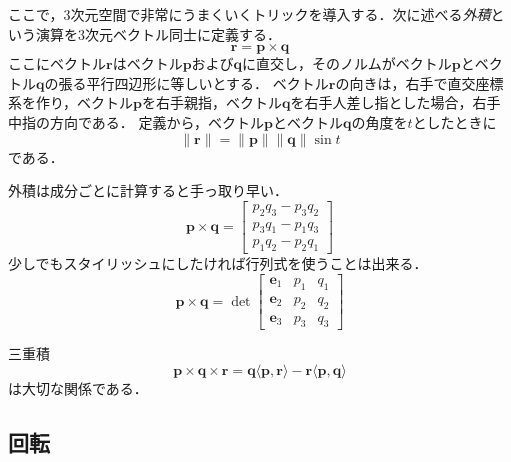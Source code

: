 \documentclass{jsbook}
\newcommand{\keyword}[1]{\emph{#1}}
\newcommand{\bvec}[1]{\boldsymbol{#1}}
\newcommand{\norm}[1]{\|{#1}\|}
\newcommand{\ve}{\bvec{e}}
\begin{document}
ここで，3次元空間で非常にうまくいくトリックを導入する．次に述べる\keyword{外積}という演算を3次元ベクトル同士に定義する．
\begin{equation}
\bvec{r}=\bvec{p}\times\bvec{q}
\end{equation}
ここにベクトル$\bvec{r}$はベクトル$\bvec{p}$および$\bvec{q}$に直交し，そのノルムがベクトル$\bvec{p}$とベクトル$\bvec{q}$の張る平行四辺形に等しいとする．
ベクトル$\bvec{r}$の向きは，右手で直交座標系を作り，ベクトル$\bvec{p}$を右手親指，ベクトル$\bvec{q}$を右手人差し指とした場合，右手中指の方向である．
%
%
定義から，ベクトル$\bvec{p}$とベクトル$\bvec{q}$の角度を$t$としたときに
\begin{equation}
\norm{\bvec{r}}=\norm{\bvec{p}}\norm{\bvec{q}}\sin t
\end{equation}
である．

外積は成分ごとに計算すると手っ取り早い．
\begin{equation}
\bvec{p}\times\bvec{q}=\begin{bmatrix}p_2q_3-p_3q_2\\p_3q_1-p_1q_3\\p_1q_2-p_2q_1\end{bmatrix}
\end{equation}
少しでもスタイリッシュにしたければ行列式を使うことは出来る．
\begin{equation}
\bvec{p}\times\bvec{q}=\det\begin{bmatrix}\ve_1&p_1&q_1\\\ve_2&p_2&q_2\\\ve_3&p_3&q_3\end{bmatrix}
\end{equation}

三重積
\begin{equation}
\bvec{p}\times\bvec{q}\times\bvec{r}=\bvec{q}\langle\bvec{p},\bvec{r}\rangle-\bvec{r}\langle\bvec{p},\bvec{q}\rangle
\end{equation}
は大切な関係である．

\subsection{回転}
\end{document}
